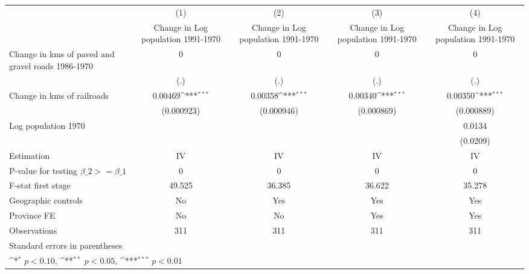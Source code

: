 {
\def\sym#1{\ifmmode^{#1}\else\(^{#1}\)\fi}
\begin{tabular}{l*{4}{c}}
\hline\hline
                    &\multicolumn{1}{c}{(1)}&\multicolumn{1}{c}{(2)}&\multicolumn{1}{c}{(3)}&\multicolumn{1}{c}{(4)}\\
                    &\multicolumn{1}{c}{Change in Log population 1991-1970}&\multicolumn{1}{c}{Change in Log population 1991-1970}&\multicolumn{1}{c}{Change in Log population 1991-1970}&\multicolumn{1}{c}{Change in Log population 1991-1970}\\
\hline
Change in kms of paved and gravel roads 1986-1970&           0         &           0         &           0         &           0         \\
                    &         (.)         &         (.)         &         (.)         &         (.)         \\
[1em]
Change in kms of railroads&     0.00469\sym{***}&     0.00358\sym{***}&     0.00340\sym{***}&     0.00350\sym{***}\\
                    &  (0.000923)         &  (0.000946)         &  (0.000869)         &  (0.000889)         \\
[1em]
Log population 1970 &                     &                     &                     &      0.0134         \\
                    &                     &                     &                     &    (0.0209)         \\
\hline
Estimation          &          IV         &          IV         &          IV         &          IV         \\
P-value for testing $\beta\_2 >= \beta\_1$&           0         &           0         &           0         &           0         \\
F-stat first stage  &      49.525         &      36.385         &      36.622         &      35.278         \\
Geographic controls &          No         &         Yes         &         Yes         &         Yes         \\
Province FE         &          No         &          No         &         Yes         &         Yes         \\
Observations        &         311         &         311         &         311         &         311         \\
\hline\hline
\multicolumn{5}{l}{\footnotesize Standard errors in parentheses}\\
\multicolumn{5}{l}{\footnotesize \sym{*} \(p<0.10\), \sym{**} \(p<0.05\), \sym{***} \(p<0.01\)}\\
\end{tabular}
}

